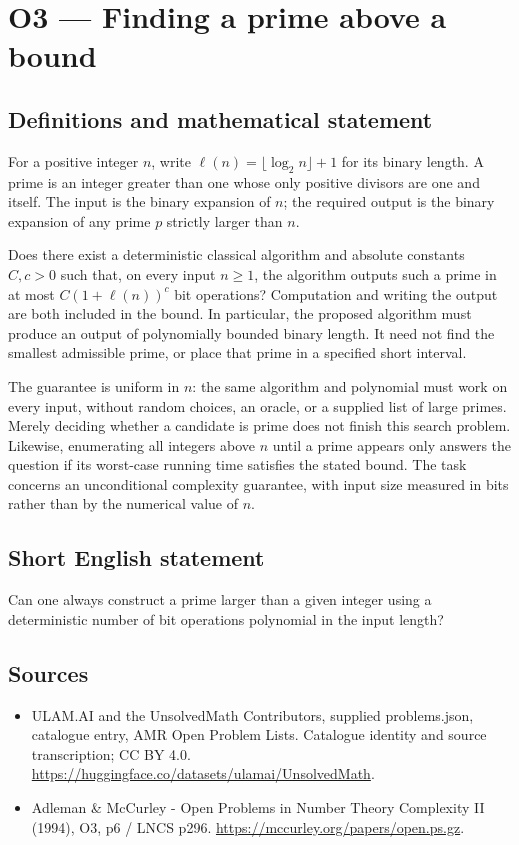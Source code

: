 \documentclass[11pt,a4paper]{article}
\begin{document}
\section*{O3 — Finding a prime above a bound}\label{statement}

\subsection{Definitions and mathematical statement}
For a positive integer $n$, write $\ell(n)=\lfloor\log_2 n\rfloor+1$ for its binary length. A prime is an integer greater than one whose only positive divisors are one and itself. The input is the binary expansion of $n$; the required output is the binary expansion of any prime $p$ strictly larger than $n$.

Does there exist a deterministic classical algorithm and absolute constants $C,c>0$ such that, on every input $n\ge1$, the algorithm outputs such a prime in at most $C(1+\ell(n))^c$ bit operations? Computation and writing the output are both included in the bound. In particular, the proposed algorithm must produce an output of polynomially bounded binary length. It need not find the smallest admissible prime, or place that prime in a specified short interval.

The guarantee is uniform in $n$: the same algorithm and polynomial must work on every input, without random choices, an oracle, or a supplied list of large primes. Merely deciding whether a candidate is prime does not finish this search problem. Likewise, enumerating all integers above $n$ until a prime appears only answers the question if its worst-case running time satisfies the stated bound. The task concerns an unconditional complexity guarantee, with input size measured in bits rather than by the numerical value of $n$.
\subsection{Short English statement}
Can one always construct a prime larger than a given integer using a deterministic number of bit operations polynomial in the input length?
\subsection{Sources}
\begin{itemize}
\item[S1] ULAM.AI and the UnsolvedMath Contributors, supplied problems.json, catalogue entry, AMR Open Problem Lists. Catalogue identity and source transcription; CC BY 4.0.
\url{https://huggingface.co/datasets/ulamai/UnsolvedMath}.
\item[S2] Adleman \& McCurley - Open Problems in Number Theory Complexity II (1994), O3, p6 / LNCS p296. 
\url{https://mccurley.org/papers/open.ps.gz}.
\end{itemize}
\end{document}
